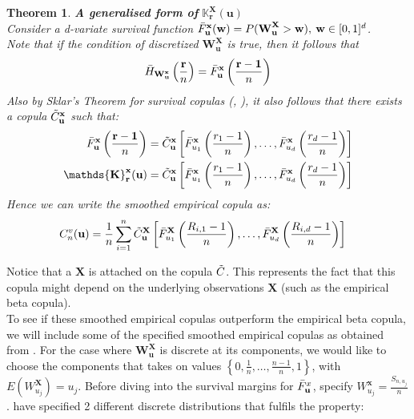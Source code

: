 \documentclass[12pt]{report}
\newtheorem{theorem}{Theorem}[subsection]
\newcommand{\1}{\mathbf{1}}
\begin{document}
\begin{flushleft}
\begin{theorem}\label{sklaronsmoothcopula}
\textit{\normalfont\parencite{KojadinovicYi2024Smooth}}\:
\textbf{A generalised form of} $\mathbf{\mathds{K}_{\textbf{r}}^{\textbf{X}}(\textbf{u})}$ \\
Consider a d-variate survival function $\Bar{F}_{\textbf{u}}^{\textbf{x}}(\textbf{w}) = P(\textbf{W}^{\textbf{X}}_{\textbf{u}} > \textbf{w} ), \: \textbf{w} \in [0,1]^{d}$.\\
Note that if the condition of discretized $\textbf{W}^{\textbf{X}}_{\textbf{u}}$ is true, then it follows that
\begin{align*}
\Bar{H}_{\textbf{W}^{\textbf{x}}_{\textbf{u}}}\left(\frac{\textbf{r}}{n}\right) = \Bar{F}_{\textbf{u}}^{\textbf{x}}\left(\frac{\textbf{r} - \textbf{1}}{n}\right)
\end{align*}
Also by Sklar's Theorem for survival copulas (\cite{HofertBook}, \cite{SklarTheorem}), it also follows that there exists a copula $\Tilde{C}_{\textbf{u}}^{\textbf{x}}$ such that:
\begin{align*}
\Bar{F}_{\textbf{u}}^{\textbf{x}}\left(\frac{\textbf{r} - \textbf{1}}{n}\right) &= \Tilde{C}_{\textbf{u}}^{\textbf{x}} \left[\Bar{F}_{u_{1}}^{\textbf{x}}\left(\frac{r_{1} - 1}{n}\right), \dots, \Bar{F}_{u_{d}}^{\textbf{x}}\left(\frac{r_{d} - 1}{n}\right) \right]\\
\mathbf{\mathds{K}_{\textbf{r}}^{\textbf{x}}(\textbf{u})} &= \Tilde{C}_{\textbf{u}}^{\textbf{x}} \left[\Bar{F}_{u_{1}}^{\textbf{x}}\left(\frac{r_{1} - 1}{n}\right), \dots, \Bar{F}_{u_{d}}^{\textbf{x}}\left(\frac{r_{d} - 1}{n}\right) \right]
\end{align*}
Hence we can write the smoothed empirical copula as:
\begin{align*}
C_{n}^{v}(\textbf{u}) &= \frac{1}{n} \sum\limits_{i = 1}^{n} \Tilde{C}_{\textbf{u}}^{\textbf{X}} \left[\Bar{F}_{u_{1}}^{\textbf{X}}\left(\frac{R_{i,1} - 1}{n}\right), \dots, \Bar{F}_{u_{d}}^{\textbf{X}}\left(\frac{R_{i,d} - 1}{n}\right) \right]
\end{align*}
\end{theorem}

Notice that a $\textbf{X}$ is attached on the copula $\Tilde{C}$. This represents the fact that this copula might depend on the underlying observations $\textbf{X}$ (such as the empirical beta copula). \\
\vspace{0.5cm}
To see if these smoothed empirical copulas outperform the empirical beta copula, we will include some of the specified smoothed empirical copulas as obtained from \cite{KojadinovicYi2024Smooth}. For the case where $\mathbf{W^{X}_{u}}$ is discrete at its components, we would like to choose the components that takes on values $\left\{0, \frac{1}{n}, \dots, \frac{n-1}{n}, 1 \right\}$, with $E(W^{\textbf{X}}_{u_{j}}) = u_{j}$. Before diving into the survival margins for $\Bar{F}^{x}_{\textbf{u}}$, specify $W_{u_{j}}^{\textbf{x}} = \frac{S_{n,u_{j}}}{n}$. \cite{KojadinovicYi2024Smooth} have specified 2 different discrete distributions that fulfils the property:


\end{flushleft}
\end{document}
